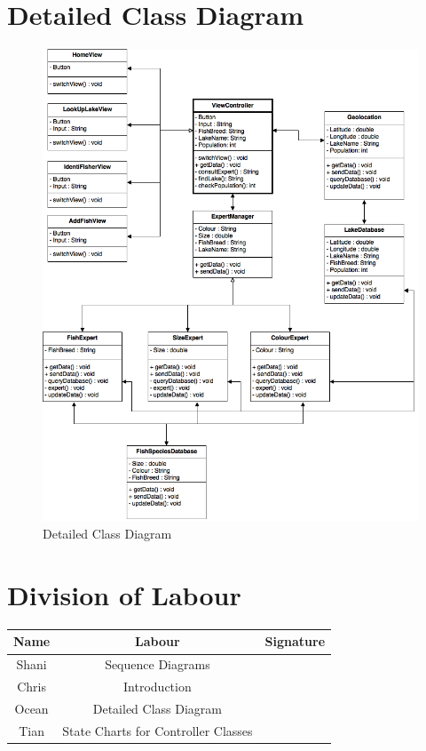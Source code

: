 \documentclass[]{article}
\begin{document}
\section{Detailed Class Diagram}
\label{sec:detailed_class_diagram}
\begin{figure}[H]
	\includegraphics[width=\textwidth]{images/DetailedClassDiagram.png}
	\caption{Detailed Class Diagram}
\end{figure}

\vfill
\listoffigures

\appendix
\section{Division of Labour}
\label{sec:division_of_labour}
\begin{center}
\begin{tabular}{ |c|c|c| }
 \hline
 Name & Labour & Signature \\ \hline
 Shani & Sequence Diagrams & \\
 Chris & Introduction  &  \\
 Ocean &  Detailed Class Diagram &  \\
 Tian & State Charts for Controller Classes & \\
 \hline
\end{tabular}
\end{center}
\end{document}
